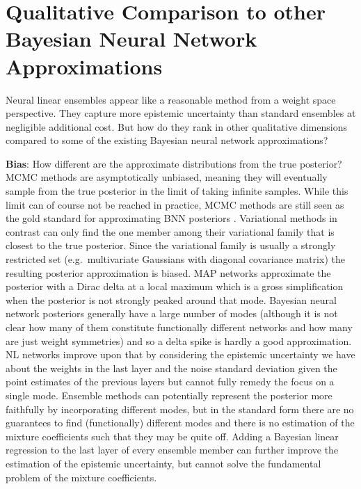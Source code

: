 \documentclass[../thesis.tex]{subfiles}
\begin{document}
\section{Qualitative Comparison to other Bayesian Neural Network Approximations}
Neural linear ensembles appear like a reasonable method from a weight space perspective. They capture more epistemic uncertainty than standard ensembles at negligible additional cost. But how do they rank in other qualitative dimensions compared to some of the existing Bayesian neural network approximations?
\medskip

\noindent \textbf{Bias}:
How different are the approximate distributions from the true posterior? MCMC methods are asymptotically unbiased, meaning they will eventually sample from the true posterior in the limit of taking infinite samples. While this limit can of course not be reached in practice, MCMC methods are still seen as the gold standard for approximating BNN posteriors \parencite{yao2019quality, gal2018sufficient}. Variational methods in contrast can only find the one member among their variational family that is closest to the true posterior. Since the variational family is usually a strongly restricted set (e.g.\ multivariate Gaussians with diagonal covariance matrix) the resulting posterior approximation is biased. MAP networks approximate the posterior with a Dirac delta at a local maximum which is a gross simplification when the posterior is not strongly peaked around that mode. Bayesian neural network posteriors generally have a large number of modes (although it is not clear how many of them constitute functionally different networks and how many are just weight symmetries) and so a delta spike is hardly a good approximation. NL networks improve upon that by considering the epistemic uncertainty we have about the weights in the last layer and the noise standard deviation given the point estimates of the previous layers but cannot fully remedy the focus on a single mode. Ensemble methods can potentially represent the posterior more faithfully by incorporating different modes, but in the standard form there are no guarantees to find (functionally) different modes and there is no estimation of the mixture coefficients such that they may be quite off. Adding a Bayesian linear regression to the last layer of every ensemble member can further improve the estimation of the epistemic uncertainty, but cannot solve the fundamental problem of the mixture coefficients.
\medskip
\end{document}
